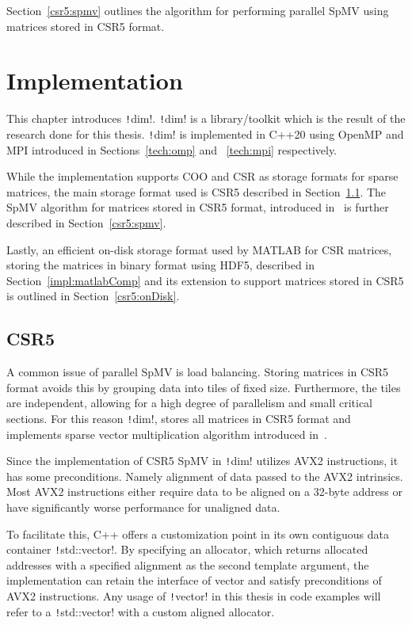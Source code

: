 \documentclass[thesis=M,english]{FITthesis}[2019/12/23]
\newcommand{\csre}[1]{\texttt!#1!}
\begin{document}
Section~\ref{csr5:spmv} outlines the algorithm for performing parallel SpMV using matrices stored in CSR5 format.


\chapter{Implementation}\label{impl}

This chapter introduces \csre{dim}. \csre{dim} is a library/toolkit which is the result of the research done for this
thesis. \csre{dim} is implemented in C++20 using OpenMP and MPI introduced in Sections~\ref{tech:omp} and
~\ref{tech:mpi} respectively.

While the implementation supports COO and CSR as storage formats for sparse matrices, the main storage
format used is CSR5 described in Section~\ref{impl:csr5}. The SpMV algorithm for matrices stored in CSR5
format, introduced in~\cite{liu2015csr5} is further described in Section~\ref{csr5:spmv}.

Lastly, an efficient on-disk storage format used by MATLAB for CSR matrices, storing the matrices in
binary format using HDF5, described in Section~\ref{impl:matlabComp} and its extension to support
matrices stored in CSR5 is outlined in Section~\ref{csr5:onDisk}.

\section{CSR5}\label{impl:csr5}

A common issue of parallel SpMV is load balancing. Storing matrices in CSR5 format avoids this by
grouping data into tiles of fixed size. Furthermore, the tiles are independent, allowing for a high
degree of parallelism and small critical sections. For this reason \csre{dim}, stores all matrices in
CSR5 format and implements sparse vector multiplication algorithm introduced in~\cite{liu2015csr5}.

Since the implementation of CSR5 SpMV in \csre{dim} utilizes AVX2 instructions, it has some preconditions.
Namely alignment of data passed to the AVX2 intrinsics. Most AVX2 instructions either require data to be
aligned on a 32-byte address or have significantly worse performance for unaligned data.

To facilitate this, C++ offers a customization point in its own contiguous data container \csre{std::vector}.
By specifying an allocator, which returns allocated addresses with a specified alignment as the second
template argument, the implementation can retain the interface of vector and satisfy preconditions of
AVX2 instructions. Any usage of \csre{vector} in this thesis in code examples will refer to a \csre{std::vector}
with a custom aligned allocator.
\end{document}
